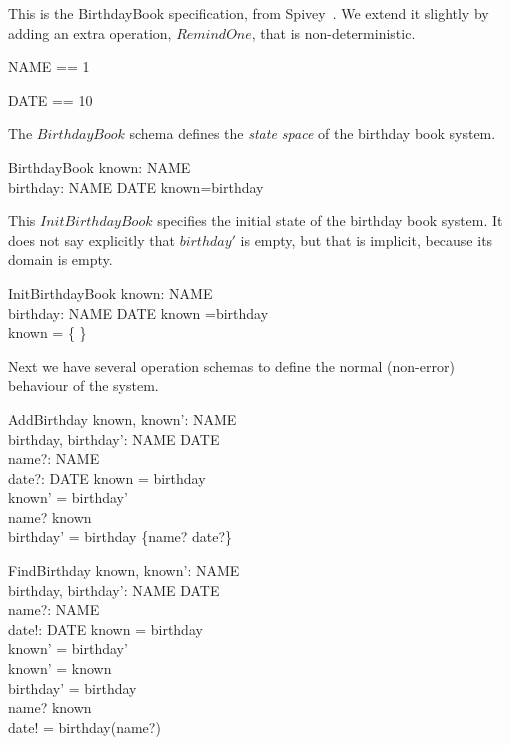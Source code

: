 \documentclass{article}
\begin{document}
This is the BirthdayBook specification, from 
Spivey~\cite{spivey:z-notation2}.  We extend it slightly
by adding an extra operation, $RemindOne$, that is non-deterministic.

\begin{zed}
   NAME == 1 
\end{zed}
\begin{zed}
   DATE == 10 
\end{zed}

The $BirthdayBook$ schema defines the \emph{state space} of 
the birthday book system. 

\begin{schema}{BirthdayBook}
    known: \power NAME \\
    birthday: NAME \pfun DATE
\where
    known=\dom birthday
\end{schema}

This $InitBirthdayBook$ specifies the initial state
of the birthday book system.  It does not say explicitly that
$birthday'$ is empty, but that is implicit, because its domain
is empty.

\begin{schema}{InitBirthdayBook}
    known: \power NAME \\
    birthday: NAME \pfun DATE
\where
    known =\dom birthday \\
    known = \{ \}
\end{schema}

Next we have several operation schemas to define the normal (non-error)
behaviour of the system.

\begin{schema}{AddBirthday}
    known, known': \power NAME \\
    birthday, birthday': NAME \pfun DATE \\
    name?: NAME \\
    date?: DATE
\where
    known = \dom birthday \\
    known' = \dom birthday' \\
    name? \notin known
\\
    birthday' = birthday \cup \{name? \mapsto date?\}
\end{schema}

\begin{schema}{FindBirthday}
    known, known': \power NAME \\
    birthday, birthday': NAME \pfun DATE \\
    name?: NAME \\
    date!: DATE 
\where
    known = \dom birthday \\
    known' = \dom birthday' \\
    known' = known \\
    birthday' = birthday \\
    name? \in known
\\
    date! = birthday(name?)
\end{schema}
\end{document}
